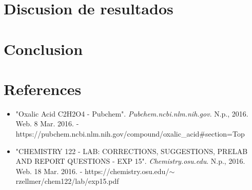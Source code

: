 \documentclass[a4paper,12pt]{article}
\begin{document}
\section{Discusion de resultados}

\section{Conclusion}

\section*{References}

\begin{itemize}
	\item  "Oxalic Acid {\textbar} C2H2O4 - Pubchem". \textit{Pubchem.ncbi.nlm.nih.gov}. N.p., 2016. Web. 8 Mar. 2016. - https://pubchem.ncbi.nlm.nih.gov/compound/oxalic\_acid\#section=Top

	\item  "CHEMISTRY 122 - LAB: CORRECTIONS, SUGGESTIONS, PRELAB AND REPORT QUESTIONS - EXP 15". \textit{Chemistry.osu.edu}. N.p., 2016. Web. 18 Mar. 2016. - https://chemistry.osu.edu/$\sim$rzellmer/chem122/lab/exp15.pdf
\end{itemize}
\end{document}
